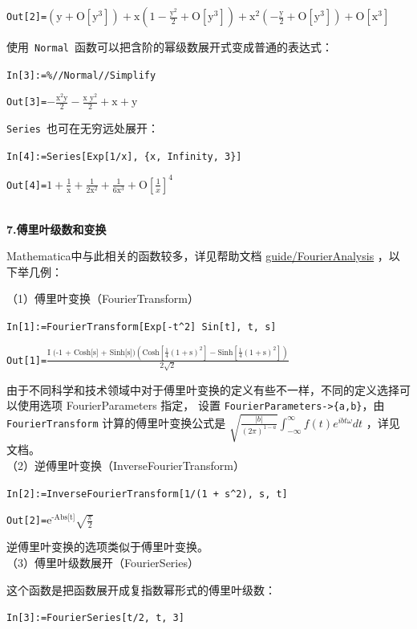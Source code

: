 \documentclass[UTF8,a4paper,10pt]{ctexart}
\begin{document}
\verb|Out[2]=|$\left(\text{y}+\text{O}[\text{y}^3]\right)+\text{x} \left(1-\frac{\text{y}^2}{2}+\text{O}[\text{y}^3]\right)+\text{x}^2 \left(-\frac{\text{y}}{2}+\text{O}[\text{y}^3]\right)+\text{O}[\text{x}^3]$

使用~\verb|Normal|~函数可以把含阶的幂级数展开式变成普通的表达式：   

\verb|In[3]:=%//Normal//Simplify|

\verb|Out[3]=|$-\frac{\text{x}^2 \text{y}}{2}-\frac{\text{x y}^2}{2}+\text{x}+\text{y}$

\verb|Series|~也可在无穷远处展开：

\verb|In[4]:=Series[Exp[1/x], {x, Infinity, 3}]|

\verb|Out[4]=|$1+\frac{1}{\text{x}}+\frac{1}{2 \text{x}^2}+\frac{1}{6 \text{x}^3}+\text{O}[\frac{1}{x}]^4$
\\
 

\textbf{7.傅里叶级数和变换}

Mathematica中与此相关的函数较多，详见帮助文档
\href{http://reference.wolfram.com/language/guide/FourierAnalysis.html}{guide/FourierAnalysis}
，以下举几例：

（1）傅里叶变换（FourierTransform）

\verb|In[1]:=FourierTransform[Exp[-t^2] Sin[t], t, s]|

\verb|Out[1]=|$\frac{\text{I (-1 + Cosh[s] + Sinh[s])} (\text{Cosh}[\frac{1}{4} (1 + \text{s})^2] - \text{Sinh}[\frac{1}{4} (1 + \text{s})^2])}{2 \sqrt{2}}$

由于不同科学和技术领域中对于傅里叶变换的定义有些不一样，不同的定义选择可以使用选项 FourierParameters 指定，
设置 \verb|FourierParameters->{a,b}|，由\verb| FourierTransform| 计算的傅里叶变换公式是
$\sqrt{\frac{\left| b\right| }{(2 \pi )^{1-a}}}\int _{-\infty }^{\infty }f(t) e^{i b t \omega }dt$
，详见文档。
\\

（2）逆傅里叶变换（InverseFourierTransform）

\verb|In[2]:=InverseFourierTransform[1/(1 + s^2), s, t]|

\verb|Out[2]=|$\text{e}^\text{-Abs[t]} \sqrt{\frac{\pi }{2}} $

逆傅里叶变换的选项类似于傅里叶变换。
\\

（3）傅里叶级数展开（FourierSeries）

这个函数是把函数展开成复指数幂形式的傅里叶级数：

\verb|In[3]:=FourierSeries[t/2, t, 3]|
\end{document}
